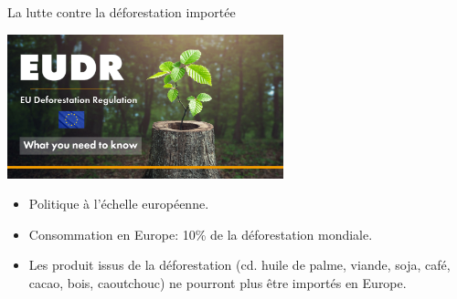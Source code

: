 \documentclass[10pt,table,dvipsnames,compress]{beamer}
\begin{document}
\begin{frame}[label={sec:org3dbc46c}]{La lutte contre la déforestation importée}
\begin{center}
\includegraphics[width=0.6\textwidth]{figs/eudr-europe.jpg}
\end{center}

\begin{itemize}
\item Politique à l'échelle européenne.
\item Consommation en Europe: 10\% de la déforestation mondiale.
\item Les produit issus de la déforestation (cd. huile de palme, viande, soja, café, cacao, bois, caoutchouc) ne pourront plus être importés en Europe.
\end{itemize}
\end{frame}
\end{document}
